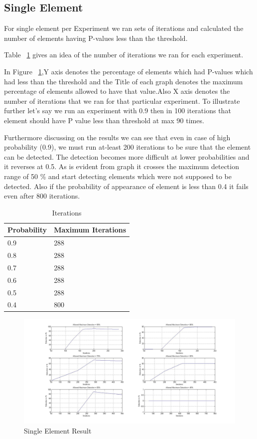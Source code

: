 \documentclass[fleqn,12pt]{SelfArx} %
\begin{document}
\subsection{Single Element}
For single element per Experiment we ran sets of iterations and calculated the number of elements having P-values less than the threshold. \par
Table ~\ref{table:iterations} gives an idea of the number of iterations we ran for each experiment. \par
In Figure ~\ref{fig:singleElementResult},Y axis denotes the percentage of elements which had P-values which had less than the threshold and the Title of each graph denotes the maximum percentage of elements allowed to have that value.Also X axis denotes the number of iterations that we ran for that particular experiment. To illustrate further let’s say we run an experiment with 0.9 then in 100 iterations that element should have P value less than threshold at max 90 times. \par
Furthermore discussing on the results we can see that even in case of high probability (0.9), we must run at-least 200 iterations to be sure that the element can be detected. The detection becomes more difficult at lower probabilities and it reverses at 0.5. As is evident from graph it crosses the maximum detection range of 50 \% and start detecting elements which were not supposed to be detected. Also if the probability of appearance of element is less than 0.4 it fails even after 800 iterations.
\begin{table}[h!]
	\begin{center}
    \begin{tabular}{| l | l |}
    \hline
    Probability & Maximum Iterations \\ \hline
    0.9& 288\\ \hline
    0.8 & 288\\ \hline
    0.7 & 288\\ \hline
    0.6 & 288\\ \hline
    0.5 & 288\\ \hline
    0.4 & 800\\
	\hline
    \end{tabular}
    \caption{Iterations}
	\label{table:iterations}
    \end{center}
\end{table}

\begin{figure}[h!]
	\includegraphics[width=\textwidth]{single_element.jpg}
    \caption{Single Element Result}
    \label{fig:singleElementResult}
\end{figure}
\end{document}
